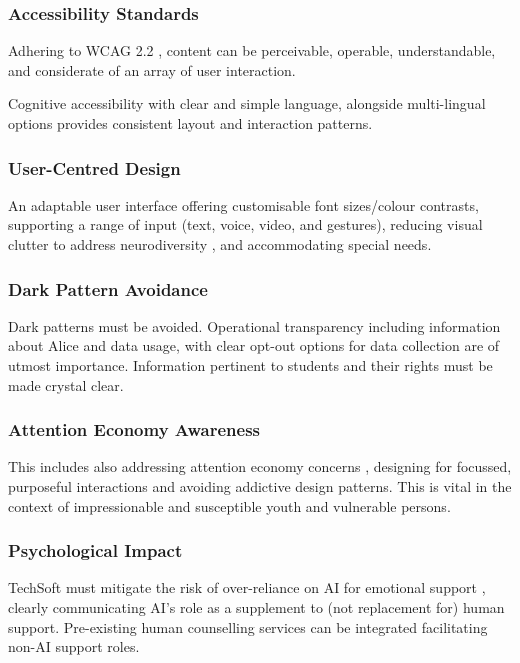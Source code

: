 \documentclass[14pt,a4paper]{article}
\begin{document}
\begin{multicols}{2}
\subsubsection{Accessibility Standards}
Adhering to WCAG 2.2 \textit{\parencite{W3C2024}}, content can be perceivable, operable, understandable, and considerate of an array of user interaction.

Cognitive accessibility \textit{\parencite[pp. 1-10]{Yesilada2024}} with clear and simple language, alongside multi-lingual options \textit{\parencite[pp. 50-100]{AnastasiouSchaler2024}} provides consistent layout and interaction patterns.

\subsubsection{User-Centred Design}
An adaptable user interface \textit{\parencite[pp. 20-50]{HarperYesilada2024}} offering customisable font sizes/colour contrasts, supporting a range of input (text, voice, video, and gestures), reducing visual clutter to address neurodiversity \textit{\parencite[pp. 30-60]{Armstrong2024}}, and accommodating special needs.

\subsubsection{Dark Pattern Avoidance}
Dark patterns \textit{\parencite{Brignull2024}} must be avoided.
Operational transparency including information about Alice and data usage, with clear opt-out options for data collection are of utmost importance.
Information pertinent to students and their rights must be made crystal clear.

\subsubsection{Attention Economy Awareness}
This includes also addressing attention economy concerns \textit{\parencite[pp. 10-30]{Williams2024}}, designing for focussed, purposeful interactions and avoiding addictive design patterns.
This is vital in the context of impressionable and susceptible youth and vulnerable persons.

\subsubsection{Psychological Impact}
TechSoft must mitigate the risk of over-reliance on AI for emotional support \textit{\parencite[p. 746]{Miner2022}}, clearly communicating AI's role as a supplement to (not replacement for) human support.
Pre-existing human counselling services can be integrated facilitating non-AI support roles.


\end{multicols}
\end{document}
